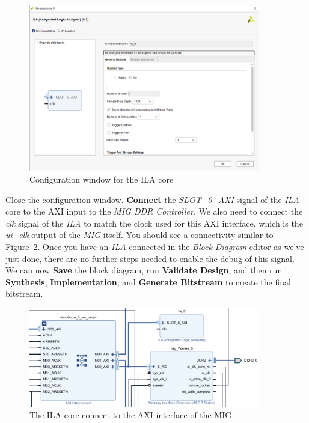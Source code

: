 \documentclass[11pt]{article}
\begin{document}
\begin{figure}[!h]
    \centering
    \includegraphics[width=0.9\textwidth]{images/ila_config.png}
    \caption{Configuration window for the ILA core}
    \label{fig:ila_config}
\end{figure}

Close the configuration window. \textbf{Connect} the \textit{SLOT\_0\_AXI} signal of the \textit{ILA} core to the AXI input to the \textit{MIG DDR Controller}. We also need to connect the \textit{clk} signal of the \textit{ILA} to match the clock used for this AXI interface, which is the \textit{ui\_clk} output of the \textit{MIG} itself. You should see a connectivity similar to Figure~\ref{fig:ila_connect}. Once you have an \textit{ILA} connected in the \textit{Block Diagram} editor as we've just done, there are no further steps needed to enable the debug of this signal. We can now \textbf{Save} the block diagram, run \textbf{Validate Design}, and then run \textbf{Synthesis}, \textbf{Implementation}, and \textbf{Generate Bitstream} to create the final bitstream.

\begin{figure}[!h]
    \centering
    \includegraphics[width=0.9\textwidth]{images/ila_connect.png}
    \caption{The ILA core connect to the AXI interface of the MIG}
    \label{fig:ila_connect}
\end{figure}
\end{document}
